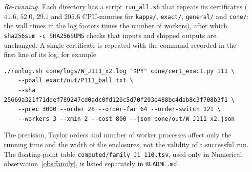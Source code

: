 \emph{Re-running.} Each directory has a script \nolinkurl{run_all.sh} that repeats its certificates ($41.6$, $52.0$, $29.1$ and $205.6$
CPU-minutes for \nolinkurl{kappa/}, \nolinkurl{exact/}, \nolinkurl{general/} and \nolinkurl{cone/}: the wall times in the log footers times the
number of workers), after which \texttt{sha256sum -c SHA256SUMS}
checks that inputs and shipped outputs are unchanged. A single certificate is repeated with the command recorded in the first
line of its log, for example
\begin{verbatim}
./runlog.sh cone/logs/W_J111_x2.log "$PY" cone/cert_exact.py 111 \
    --pball exact/out/P111_ball.txt \
    --sha 25669a321f71ddef789247cd0adc0fd129c5d70f293e488bc4dab8c3f708b3f1 \
    --prec 3000 --order 28 --order-far 64 --order-switch 121 \
    --workers 3 --xmin 2 --cost 800 --json cone/out/W_J111_x2.json
\end{verbatim}
The precision, Taylor orders and number of worker processes affect only the running time and the width of the
enclosures, not the validity of a successful run. The floating-point table \nolinkurl{computed/family_J1_110.tsv}, used only in
Numerical observation~\ref{obs:family}, is listed separately in \nolinkurl{README.md}.

